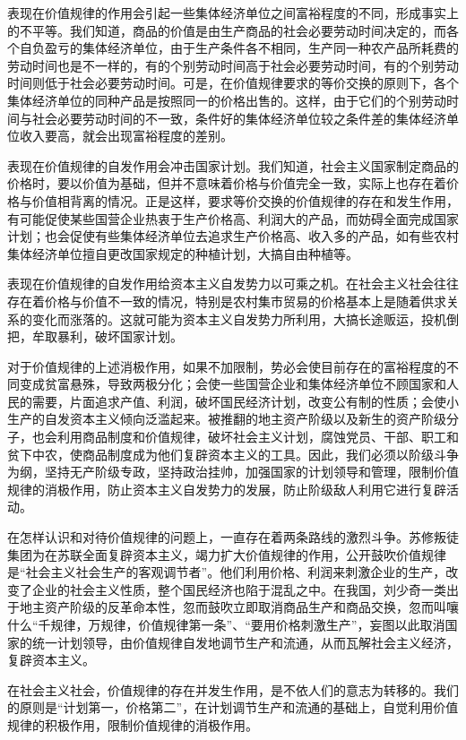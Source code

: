 \documentclass{book}
\begin{document}
表现在价值规律的作用会引起一些集体经济单位之间富裕程度的不同，形成事实上的不平等。我们知道，商品的价值是由生产商品的社会必要劳动时间决定的，而各个自负盈亏的集体经济单位，由于生产条件各不相同，生产同一种农产品所耗费的劳动时间也是不一样的，有的个别劳动时间高于社会必要劳动时间，有的个别劳动时间则低于社会必要劳动时间。可是，在价值规律要求的等价交换的原则下，各个集体经济单位的同种产品是按照同一的价格出售的。这样，由于它们的个别劳动时间与社会必要劳动时间的不一致，条件好的集体经济单位较之条件差的集体经济单位收入要高，就会出现富裕程度的差别。

表现在价值规律的自发作用会冲击国家计划。我们知道，社会主义国家制定商品的价格时，要以价值为基础，但并不意味着价格与价值完全一致，实际上也存在着价格与价值相背离的情况。正是这样，要求等价交换的价值规律的存在和发生作用，有可能促使某些国营企业热衷于生产价格高、利润大的产品，而妨碍全面完成国家计划；也会促使有些集体经济单位去追求生产价格高、收入多的产品，如有些农村集体经济单位擅自更改国家规定的种植计划，大搞自由种植等。

表现在价值规律的自发作用给资本主义自发势力以可乘之机。在社会主义社会往往存在着价格与价值不一致的情况，特别是农村集市贸易的价格基本上是随着供求关系的变化而涨落的。这就可能为资本主义自发势力所利用，大搞长途贩运，投机倒把，牟取暴利，破坏国家计划。

对于价值规律的上述消极作用，如果不加限制，势必会使目前存在的富裕程度的不同变成贫富悬殊，导致两极分化；会使一些国营企业和集体经济单位不顾国家和人民的需要，片面追求产值、利润，破坏国民经济计划，改变公有制的性质；会使小生产的自发资本主义倾向泛滥起来。被推翻的地主资产阶级以及新生的资产阶级分子，也会利用商品制度和价值规律，破坏社会主义计划，腐蚀党员、干部、职工和贫下中农，使商品制度成为他们复辟资本主义的工具。因此，我们必须以阶级斗争为纲，坚持无产阶级专政，坚持政治挂帅，加强国家的计划领导和管理，限制价值规律的消极作用，防止资本主义自发势力的发展，防止阶级敌人利用它进行复辟活动。

在怎样认识和对待价值规律的问题上，一直存在着两条路线的激烈斗争。苏修叛徒集团为在苏联全面复辟资本主义，竭力扩大价值规律的作用，公开鼓吹价值规律是“社会主义社会生产的客观调节者”。他们利用价格、利润来刺激企业的生产，改变了企业的社会主义性质，整个国民经济也陷于混乱之中。在我国，刘少奇一类出于地主资产阶级的反革命本性，忽而鼓吹立即取消商品生产和商品交换，忽而叫嚷什么“千规律，万规律，价值规律第一条”、“要用价格刺激生产”，妄图以此取消国家的统一计划领导，由价值规律自发地调节生产和流通，从而瓦解社会主义经济，复辟资本主义。

在社会主义社会，价值规律的存在并发生作用，是不依人们的意志为转移的。我们的原则是“计划第一，价格第二”，在计划调节生产和流通的基础上，自觉利用价值规律的积极作用，限制价值规律的消极作用。
\end{document}
